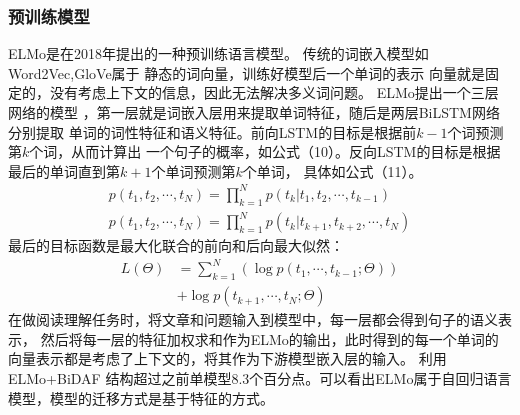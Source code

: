 \subsubsection{预训练模型}\label{pretrain}
ELMo是在2018年提出的一种预训练语言模型。
传统的词嵌入模型如Word2Vec,GloVe属于
静态的词向量，训练好模型后一个单词的表示
向量就是固定的，没有考虑上下文的信息，因此无法解决多义词问题。
ELMo提出一个三层网络的模型
，第一层就是词嵌入层用来提取单词特征，随后是两层BiLSTM网络分别提取
单词的词性特征和语义特征。前向LSTM的目标是根据前$k-1$个词预测第$k$个词，从而计算出
一个句子的概率，如公式（10）。反向LSTM的目标是根据最后的单词直到第$k+1$个单词预测第$k$个单词，
具体如公式（11）。
\begin{gather}
    p(t_1,t_2,\cdots,t_N)=\prod_{k=1}^{N}p(t_k|t_1,t_2,\cdots,t_{k-1})\\
    p(t_1,t_2,\cdots,t_N)=\prod_{k=1}^{N}p(t_k|t_{k+1},t_{k+2},\cdots,t_{N})
\end{gather}
最后的目标函数是最大化联合的前向和后向最大似然：
\begin{equation}
    \begin{split}
    L(\Theta)&=\sum_{k=1}^{N}(\log p(t_1,\cdots,t_{k-1};\Theta)) \\
        &+\log p(t_{k+1},\cdots,t_N;\Theta)
    \end{split}
\end{equation}
在做阅读理解任务时，将文章和问题输入到模型中，每一层都会得到句子的语义表示，
然后将每一层的特征加权求和作为ELMo的输出，此时得到的每一个单词的
向量表示都是考虑了上下文的，将其作为下游模型嵌入层的输入。
利用ELMo+BiDAF
结构超过之前单模型8.3个百分点。可以看出ELMo属于自回归语言模型，模型的迁移方式是基于特征的方式。




